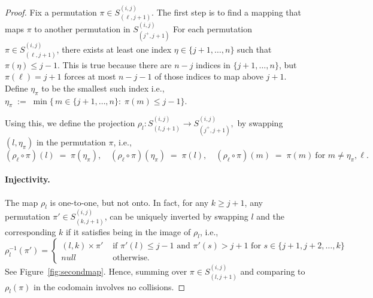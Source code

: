 \documentclass{article}
\begin{document}
\begin{proof}
Fix a permutation  $\pi \in S^{(i,j)}_{(\ell,j+1)}$. The first step is to find a mapping that maps $\pi$ to another permutation in $S^{(i,j)}_{(j^+,j+1)}$
For each permutation $\pi \in S^{(i,j)}_{(\ell,j+1)}$, there exists at least one index $\eta \in \{j+1,\dots,n\}$ such that $\pi(\eta) \le j-1$.  This is true 
because there are $n-j$ indices in $\{j+1,\dots,n\}$, but $\pi(\ell)=j+1$ forces at most $n-j-1$ of those indices to map above $j+1$.  
Define $\eta_\pi$ to be the smallest such index i.e., $  \eta_\pi \;:=\;
  \min\bigl\{\,
    m \in \{j+1,\dots,n\}:\;\pi(m)\le j-1
  \bigr\}$.


    Using this, we define the projection 
    $\rho_l: S^{(i,j)}_{(l,j+1)}\rightarrow S^{(i,j)}_{(j^+,j+1)},$ by swapping $(l,\eta_\pi)$ in the permutation $\pi$, i.e.,
    \[
  (\rho_\ell \circ \pi)(l) \;=\;\pi(\eta_\pi), 
  \quad
  (\rho_\ell  \circ\pi)(\eta_\pi)\;=\;\pi(l),
  \quad
  (\rho_\ell  \circ\pi)(m)\;=\;\pi(m)\ \text{for }m\neq \eta_\pi,\ell.\]


\paragraph{Injectivity.}
The map $\rho_l$ is one-to-one, but not onto. 
 In fact, for any $k\ge j+1$, any permutation $\pi'\in S^{(i,j)}_{(k,j+1)}$, can be uniquely inverted by swapping $l$ and the corresponding $k$ if it satisfies being in the image of $\rho_l$, i.e.,
    \begin{equation}\rho_l^{-1}(\pi') =
    \begin{cases}
             (l,k)\times \pi' & \text{ if } \pi'(l) \le j-1\text{ and }\pi'(s)> j+1 \text{ for }s\in\{j+1,j+2,\ldots,k\}\\
             null               & \text{ otherwise.}
    \end{cases}
    \end{equation}
    See Figure~\ref{fig:secondmap}.
Hence, summing over $\pi\in S^{(i,j)}_{(l,j+1)}$ and comparing to $\rho_l(\pi)$ in the codomain involves no collisions.



\end{proof}
\end{document}
